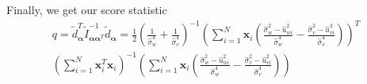 \documentclass[aoas,preprint]{imsart}
\numberwithin{equation}{section}
\theoremstyle{plain}
\begin{document}
Finally, we get our score statistic
\begin{equation}
    \begin{multlined}
    q = \tilde{d}_{\bm{\alpha}}^T \tilde{I}_{\bm{\alpha}\bm{\alpha}^T}^{-1}
    \tilde{d}_{\bm{\alpha}}
    =\frac{1}{2}\left( \frac{1}{\hat{\sigma}_w^4}+\frac{1}{\hat{\sigma}_v^4}\right)^{-1}
\left(\sum_{i=1}^{N} \bm{x}_{i} 
\left(
\frac{\hat{\sigma}_w^2-\hat{u}_{wi}^2}{\hat{\sigma}_w^4}- \frac{\hat{\sigma}_v^2-\hat{u}_{vi}^2}{\hat{\sigma}_v^4}
\right)
\right)^T \\
\left( \sum_{i=1}^{N} \bm{x}_i^T \bm{x}_i \right)^{-1}
\left(
\sum_{i=1}^{N} \bm{x}_{i} 
\left(
\frac{\hat{\sigma}_w^2-\hat{u}_{wi}^2}{\hat{\sigma}_w^4}- \frac{\hat{\sigma}_v^2-\hat{u}_{vi}^2}{\hat{\sigma}_v^4}
\right)
\right)
    \end{multlined}
\end{equation}

\pagebreak
\end{document}

